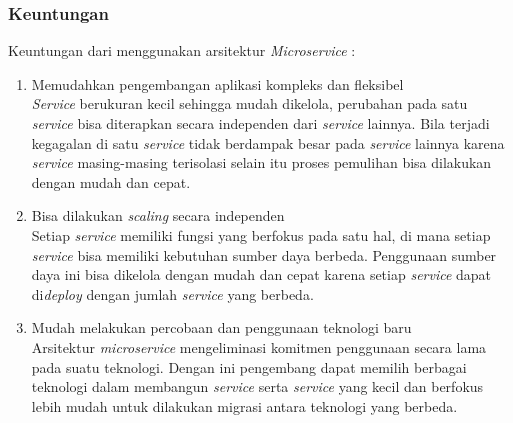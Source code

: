 \subsubsection{Keuntungan}
Keuntungan dari menggunakan arsitektur \textit{Microservice}  \cite{ECD,74C,1C7}:
\begin{enumerate}[leftmargin=1.3cm]
	\item Memudahkan pengembangan aplikasi kompleks dan fleksibel\\
	\textit{Service} berukuran kecil sehingga mudah dikelola, perubahan pada satu \textit{service} bisa diterapkan secara independen dari \textit{service} lainnya. Bila terjadi kegagalan di satu \textit{service} tidak berdampak besar pada \textit{service} lainnya karena \textit{service} masing-masing terisolasi selain itu proses pemulihan bisa dilakukan dengan mudah dan cepat.
	\item Bisa dilakukan \textit{scaling} secara independen\\ 
	Setiap \textit{service} memiliki fungsi yang berfokus pada satu hal,  di mana setiap \textit{service} bisa memiliki kebutuhan sumber daya berbeda. Penggunaan sumber daya ini bisa dikelola dengan mudah dan cepat karena setiap \textit{service} dapat di\textit{deploy} dengan jumlah \textit{service} yang berbeda.
	\item Mudah melakukan percobaan dan penggunaan teknologi baru\\
	Arsitektur \textit{microservice} mengeliminasi komitmen penggunaan secara lama pada suatu teknologi. Dengan ini pengembang dapat memilih berbagai teknologi dalam membangun \textit{service} serta \textit{service} yang kecil dan berfokus lebih mudah untuk dilakukan migrasi antara teknologi yang berbeda. 
\end{enumerate}	

